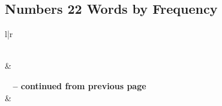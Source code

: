 

\subsection{Numbers 22 Words by Frequency}


\normalsize
 
\begin{center}
\begin{longtable}{l|r}
\caption[Numbers 22 Words by Frequency]{Numbers 22 Words by Frequency}\label{table:WordsbyFrequency for Numbers 22} \\
\hline {} &  \\ \hline 
\endfirsthead
 
{{\bfseries \tablename\ \thetable{} -- continued from previous page}} \\  
\hline {} &  \\ \hline 
\endhead
 

\end{longtable}
\end{center}
